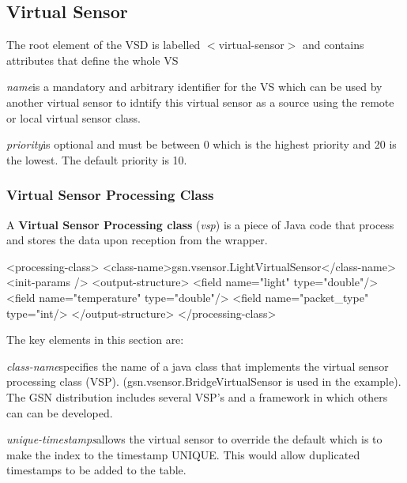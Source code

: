 \subsection{Virtual Sensor}

The root element of the VSD is labelled
\begin{math}<\end{math}virtual-sensor\begin{math}>\end{math} and
contains attributes that define the whole VS

\textit{name}\hspace{15pt}is a mandatory and arbitrary identifier for
the VS which can be used by another virtual sensor to idntify this
virtual sensor as a source using the remote or local virtual sensor
class.

\textit{priority}\hspace{15pt}is optional and must be between 0 which
is the highest priority and 20 is the lowest. The default priority is
10.

\subsubsection{Virtual Sensor Processing Class}

A \textbf{Virtual Sensor Processing class} (\textit{vsp}) is a piece
of Java code that process and stores the data upon reception from the
wrapper.

\begin{xmlcode}
	<processing-class>
		<class-name>gsn.vsensor.LightVirtualSensor</class-name>
		<init-params />
		<output-structure>
			<field name="light" type="double"/>
			<field name="temperature" type="double"/>
			<field name="packet_type" type="int/>
		</output-structure>
	</processing-class>
\end{xmlcode}
The key elements in this section are:

\textit{class-name}\hspace{15pt}specifies the name of a java class
that implements the virtual sensor processing class (VSP).
(gsn.vsensor.BridgeVirtualSensor is used in the example).  The GSN
distribution includes several VSP's and a framework in which others can
can be developed.

\textit{unique-timestamps}\hspace{15pt}allows the virtual sensor to
override the default which is to make the index to the timestamp
UNIQUE.  This would allow duplicated timestamps to be added to the
table.

